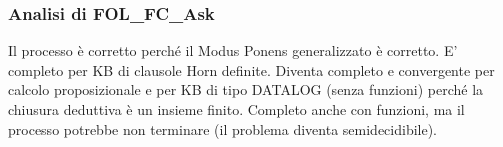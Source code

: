 \documentclass{article}
\begin{document}
\subsubsection{Analisi di FOL\_FC\_Ask}
Il processo è corretto perché il Modus Ponens generalizzato è corretto. E' completo per KB di clausole Horn definite. Diventa completo e convergente per calcolo proposizionale e per KB di tipo DATALOG (senza funzioni) perché la chiusura deduttiva è un insieme finito. Completo anche con funzioni, ma il processo potrebbe non terminare (il problema diventa semidecidibile).




































%
%
\end{document}
